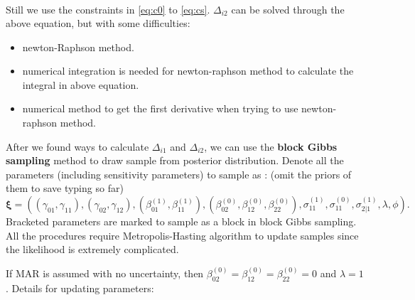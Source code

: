 \documentclass[12pt]{article}
\begin{document}
\begin{enumerate}
\begin{align}
  \end{align}
  Still we use the constraints in \eqref{eq:c0} to
  \eqref{eq:cs}. $\Delta_{i2}$ can be solved through the above
  equation, but with some difficulties:
  \begin{itemize}
  \item newton-Raphson method.
  \item numerical integration is needed for newton-raphson method to
    calculate the integral in above equation.
  \item numerical method to get the first derivative when trying to
    use newton-raphson method.
  \end{itemize}
\end{enumerate}

After we found ways to calculate $\Delta_{i1}$ and $\Delta_{i2}$, we
can use the \textbf{block Gibbs sampling} method to draw sample from
posterior distribution. Denote all the parameters (including
sensitivity parameters) to sample as : (omit the priors of them to
save typing so far)
\begin{displaymath}
  \bm \xi = \left( (\gamma_{01}, \gamma_{11}),
    (\gamma_{02}, \gamma_{12}), (\beta_{01}^{(1)}, \beta_{11}^{(1)}),
    (\beta_{02}^{(0)}, \beta_{12}^{(0)}, \beta_{22}^{(0)}),
    \sigma_{11}^{(1)}, \sigma_{11}^{(0)}, \sigma_{2|1}^{(1)}, \lambda,
    \phi \right).
\end{displaymath}
Bracketed parameters are marked to sample as a block in block Gibbs
sampling.  All the procedures require Metropolis-Hasting algorithm to
update samples since the likelihood is extremely complicated.

If MAR is assumed with no uncertainty, then $\beta_{02}^{(0)} =
\beta_{12}^{(0)} = \beta_{22}^{(0)} = 0$ and $\lambda = 1$. Details
for updating parameters:
\end{document}
